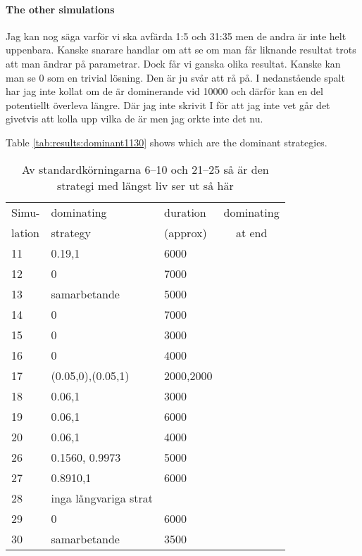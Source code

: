 
\paragraph{The other simulations} Jag kan nog säga varför vi ska avfärda 1:5 och 31:35 men de andra är inte helt uppenbara. Kanske
snarare handlar om att se om man får liknande resultat trots att man ändrar på parametrar. Dock får vi
ganska olika resultat. Kanske kan man se 0 som en trivial lösning. Den är ju svår att rå på. I
nedanstående spalt har jag inte kollat om de är dominerande vid 10000 och därför kan en del
potentiellt överleva längre. Där jag inte skrivit I för att jag inte vet går det givetvis att kolla upp vilka
de är men jag orkte inte det nu.\mypar

Table \ref{tab:results:dominant1130} shows which are the dominant strategies.

\begin{table}[!hbtp]
  \footnotesize
  \centering
  \label{tab:results:dominant610}
  \caption{Av standardkörningarna 6--10 och 21--25 så är den strategi med längst liv ser ut så här}
  
  \begin{tabular}{lllc}
    Simu-  & dominating & duration  & dominating \\
    lation & strategy   & (approx)  & at end \\
    \hline
11  &  0.19,1              & 6000      \\          
12  &  0                   & 7000               \\ 
13  &  samarbetande        & 5000               \\ 
14  &  0                   & 7000               \\ 
15  &  0                   & 3000               \\ 
16  &  0                   & 4000      \\          
17  &  (0.05,0),(0.05,1)   & 2000,2000 \\          
18  &  0.06,1              & 3000               \\ 
19  &  0.06,1              & 6000      \\          
20  &  0.06,1              & 4000      \\          
26  & 0.1560, 0.9973       & 5000\\          
27  & 0.8910,1             & 6000\\          
28  & inga långvariga strat&              \\ 
29  & 0                    & 6000\\          
30  & samarbetande         & 3500\\          
    \hline
  \end{tabular}
\end{table}


